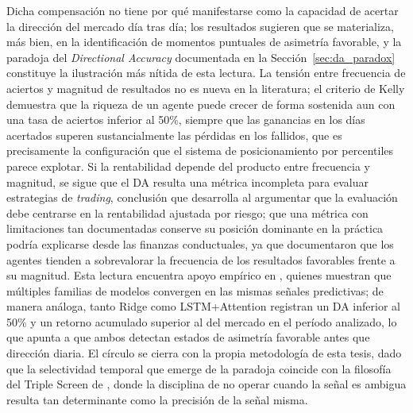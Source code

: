 ﻿\documentclass[11pt,a4paper]{article}
\begin{document}
Dicha compensaci\'on no tiene por qu\'e manifestarse como la capacidad de acertar la direcci\'on del mercado d\'ia tras d\'ia; los resultados sugieren que se materializa, m\'as bien, en la identificaci\'on de momentos puntuales de asimetr\'ia favorable, y la paradoja del \textit{Directional Accuracy} documentada en la Secci\'on~\ref{sec:da_paradox} constituye la ilustraci\'on m\'as n\'itida de esta lectura. La tensi\'on entre frecuencia de aciertos y magnitud de resultados no es nueva en la literatura; el criterio de Kelly \citep{kelly1956} demuestra que la riqueza de un agente puede crecer de forma sostenida aun con una tasa de aciertos inferior al 50\%, siempre que las ganancias en los d\'ias acertados superen sustancialmente las p\'erdidas en los fallidos, que es precisamente la configuraci\'on que el sistema de posicionamiento por percentiles parece explotar. Si la rentabilidad depende del producto entre frecuencia y magnitud, se sigue que el DA resulta una m\'etrica incompleta para evaluar estrategias de \textit{trading}, conclusi\'on que \citet{lopezdeprado2018} desarrolla al argumentar que la evaluaci\'on debe centrarse en la rentabilidad ajustada por riesgo; que una m\'etrica con limitaciones tan documentadas conserve su posici\'on dominante en la pr\'actica podr\'ia explicarse desde las finanzas conductuales, ya que \citet{kahneman1979} documentaron que los agentes tienden a sobrevalorar la frecuencia de los resultados favorables frente a su magnitud. Esta lectura encuentra apoyo emp\'irico en \citet{gu2020}, quienes muestran que m\'ultiples familias de modelos convergen en las mismas se\~nales predictivas; de manera an\'aloga, tanto Ridge como LSTM+Attention registran un DA inferior al 50\% y un retorno acumulado superior al del mercado en el per\'iodo analizado, lo que apunta a que ambos detectan estados de asimetr\'ia favorable antes que direcci\'on diaria. El c\'irculo se cierra con la propia metodolog\'ia de esta tesis, dado que la selectividad temporal que emerge de la paradoja coincide con la filosof\'ia del Triple Screen de \citet{elder1993}, donde la disciplina de no operar cuando la se\~nal es ambigua resulta tan determinante como la precisi\'on de la se\~nal misma.
\end{document}
